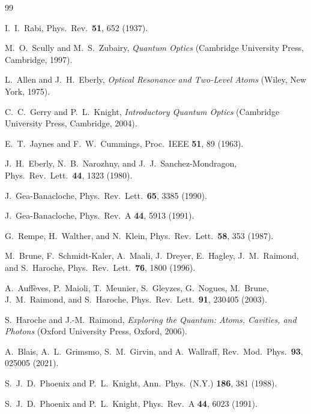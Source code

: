 \documentclass[%
 reprint,
 amsmath,amssymb,
 aps,
 floatfix,
]{revtex4-2}
\begin{document}

\begin{thebibliography}{99}

I.~I.~Rabi, Phys.\ Rev.\ \textbf{51}, 652 (1937).

M.~O.~Scully and M.~S.~Zubairy, \textit{Quantum Optics} (Cambridge University Press, Cambridge, 1997).

L.~Allen and J.~H.~Eberly, \textit{Optical Resonance and Two-Level Atoms} (Wiley, New York, 1975).

C.~C.~Gerry and P.~L.~Knight, \textit{Introductory Quantum Optics} (Cambridge University Press, Cambridge, 2004).

E.~T.~Jaynes and F.~W.~Cummings, Proc.\ IEEE \textbf{51}, 89 (1963).

J.~H.~Eberly, N.~B.~Narozhny, and J.~J.~Sanchez-Mondragon, Phys.\ Rev.\ Lett.\ \textbf{44}, 1323 (1980).

J.~Gea-Banacloche, Phys.\ Rev.\ Lett.\ \textbf{65}, 3385 (1990).

J.~Gea-Banacloche, Phys.\ Rev.\ A \textbf{44}, 5913 (1991).

G.~Rempe, H.~Walther, and N.~Klein, Phys.\ Rev.\ Lett.\ \textbf{58}, 353 (1987).

M.~Brune, F.~Schmidt-Kaler, A.~Maali, J.~Dreyer, E.~Hagley, J.~M.~Raimond, and S.~Haroche, Phys.\ Rev.\ Lett.\ \textbf{76}, 1800 (1996).

A.~Auff\`{e}ves, P.~Maioli, T.~Meunier, S.~Gleyzes, G.~Nogues, M.~Brune, J.~M.~Raimond, and S.~Haroche, Phys.\ Rev.\ Lett.\ \textbf{91}, 230405 (2003).

S.~Haroche and J.-M.~Raimond, \textit{Exploring the Quantum: Atoms, Cavities, and Photons} (Oxford University Press, Oxford, 2006).

A.~Blais, A.~L.~Grimsmo, S.~M.~Girvin, and A.~Wallraff, Rev.\ Mod.\ Phys.\ \textbf{93}, 025005 (2021).

S.~J.~D.~Phoenix and P.~L.~Knight, Ann.\ Phys.\ (N.Y.) \textbf{186}, 381 (1988).

S.~J.~D.~Phoenix and P.~L.~Knight, Phys.\ Rev.\ A \textbf{44}, 6023 (1991).


\end{thebibliography}
\end{document}

